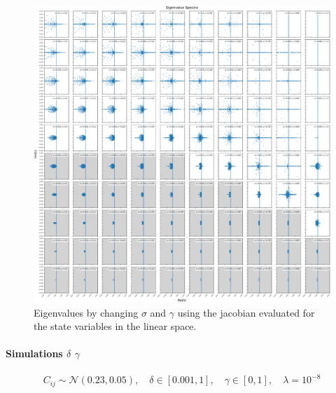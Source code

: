 \documentclass[11pt,a4paper,fleqn]{scrartcl}
\begin{document}
\begin{figure}[H]
    \centering
    \includegraphics[width=\linewidth]{SigmaGamma/EigenValuesLinSigmaGamma.pdf}
    \caption{Eigenvalues by changing $\sigma$ and $\gamma$ using the jacobian evaluated for the state variables in the linear space.}
\end{figure}
\clearpage

\paragraph{Simulations $\delta$ $\gamma$}

\[
C_{ij} \sim \mathcal{N}(0.23, 0.05), \quad 
\delta \in [0.001, 1], \quad 
\gamma \in [0, 1], \quad \lambda = 10^{-8}
\]
\end{document}
